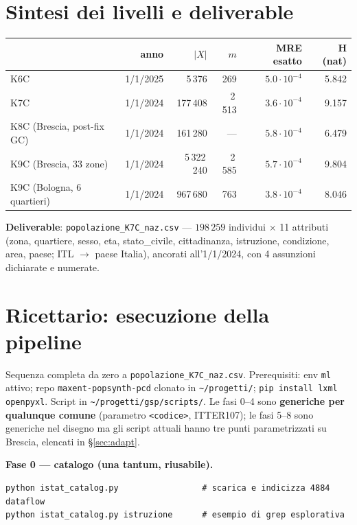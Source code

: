 \documentclass[11pt,a4paper]{article}
\newcommand{\code}[1]{\texttt{#1}}
\begin{document}
\section{Sintesi dei livelli e deliverable}
\begin{center}
\small
\begin{tabular}{@{}lrrrrr@{}}
\toprule
 & \textbf{anno} & $|X|$ & $m$ & \textbf{MRE esatto} & \textbf{H (nat)}\\
\midrule
K6C & 1/1/2025 & 5\,376 & 269 & $5.0\cdot10^{-4}$ & 5.842\\
K7C & 1/1/2024 & 177\,408 & 2\,513 & $3.6\cdot10^{-4}$ & 9.157\\
K8C (Brescia, post-fix GC) & 1/1/2024 & 161\,280 & --- & $5.8\cdot10^{-4}$ & 6.479\\
K9C (Brescia, 33 zone) & 1/1/2024 & 5\,322\,240 & 2\,585 & $5.7\cdot10^{-4}$ & 9.804\\
K9C (Bologna, 6 quartieri) & 1/1/2024 & 967\,680 & 763 & $3.8\cdot10^{-4}$ & 8.046\\
\bottomrule
\end{tabular}
\end{center}
\noindent\textbf{Deliverable}: \code{popolazione\_K7C\_naz.csv} ---
$198\,259$ individui $\times$ 11 attributi (zona, quartiere, sesso, eta,
stato\_civile, cittadinanza, istruzione, condizione, area, paese; ITL $\to$
paese Italia), ancorati all'1/1/2024, con 4 assunzioni dichiarate e
numerate.

\section{Ricettario: esecuzione della pipeline}
\label{sec:recipe}
Sequenza completa da zero a \code{popolazione\_K7C\_naz.csv}. Prerequisiti:
env \code{ml} attivo; repo \code{maxent-popsynth-pcd} clonato in
\code{\textasciitilde/progetti/}; \code{pip install lxml openpyxl}. Script
in \code{\textasciitilde/progetti/gsp/scripts/}. Le fasi 0--4 sono
\textbf{generiche per qualunque comune} (parametro \code{<codice>},
ITTER107); le fasi 5--8 sono generiche nel disegno ma gli script attuali
hanno tre punti parametrizzati su Brescia, elencati in
\S\ref{sec:adapt}.

\medskip\noindent\textbf{Fase 0 --- catalogo (una tantum, riusabile).}
\begin{lstlisting}
python istat_catalog.py                 # scarica e indicizza 4884 dataflow
python istat_catalog.py istruzione      # esempio di grep esplorativa
\end{lstlisting}
\end{document}
